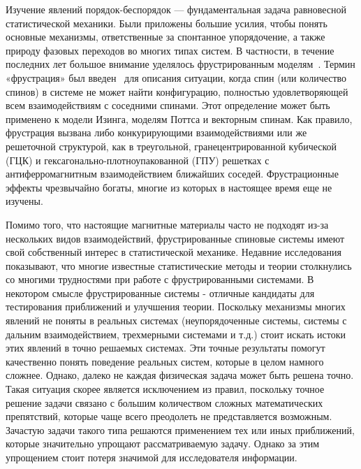
{\actuality} Изучение явлений порядок-беспорядок --- фундаментальная задача равновесной статистической механики. Были приложены большие усилия, чтобы понять основные механизмы, ответственные за спонтанное упорядочение, а также природу фазовых переходов во многих типах систем. В частности, в течение последних лет большое внимание уделялось фрустрированным моделям~\cite{liebmann1986}. Термин «фрустрация» был введен~\cite{toulouse1977,vannimenus1977} для описания ситуации, когда спин (или количество спинов) в системе не может найти конфигурацию, полностью удовлетворяющей всем взаимодействиям с соседними спинами. Этот определение может быть применено к модели Изинга, моделям Поттса и векторным спинам. Как правило, фрустрация вызвана либо конкурирующими взаимодействиями или же решеточной структурой, как в треугольной, гранецентрированной кубической (ГЦК) и гексагонально-плотноупакованной (ГПУ) решетках с антиферромагнитным взаимодействием ближайших соседей. Фрустрационные эффекты чрезвычайно богаты, многие из которых в настоящее время еще не изучены.

Помимо того, что настоящие магнитные материалы часто не подходят из-за нескольких видов взаимодействий, фрустрированные спиновые системы имеют свой собственный интерес в статистической механике. Недавние исследования показывают, что многие известные статистические методы и теории столкнулись со многими трудностями при работе с фрустрированными системами. В некотором смысле фрустрированные системы - отличные кандидаты для тестирования приближений и улучшения теории. Поскольку механизмы многих явлений не поняты в реальных системах (неупорядоченные системы, системы с дальним взаимодействием, трехмерными системами и т.д.) стоит искать истоки этих явлений в точно решаемых системах. Эти точные результаты помогут качественно понять поведение реальных систем, которые в целом намного сложнее.
Однако, далеко не каждая физическая задача может быть решена точно. Такая ситуация скорее является исключением из правил, поскольку точное решение задачи связано с большим количеством сложных математических препятствий, которые чаще всего преодолеть не представляется возможным. Зачастую задачи такого типа решаются применением тех или иных приближений, которые значительно упрощают рассматриваемую задачу. Однако за этим упрощением стоит потеря значимой для исследователя информации.

